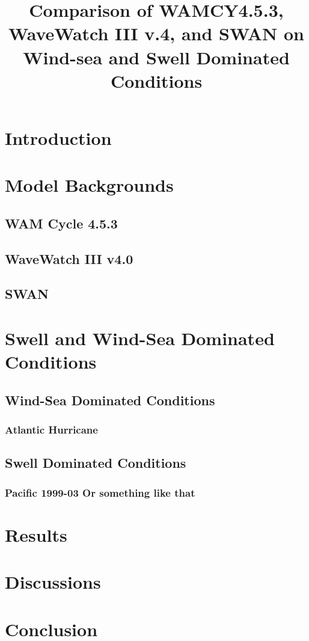 \documentclass[12pt,letterpaper]{article}
\begin{document}
\title{Comparison of WAMCY4.5.3, WaveWatch III v.4, and SWAN on Wind-sea and Swell Dominated Conditions}
\maketitle
\section{Introduction}

\section{Model Backgrounds}

\subsection{WAM Cycle 4.5.3}
\subsection{WaveWatch III v4.0}
\subsection{SWAN}

\section{Swell and Wind-Sea Dominated Conditions}
\subsection{Wind-Sea Dominated Conditions}
\subsubsection{Atlantic Hurricane }

\subsection{Swell Dominated Conditions}
\subsubsection{Pacific 1999-03 Or something like that}

\section{Results}
\section{Discussions}
\section{Conclusion}
\end{document}
